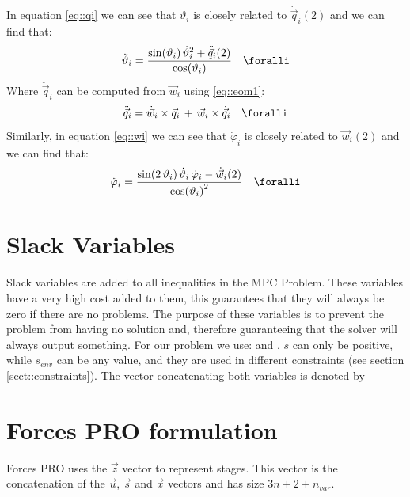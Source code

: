In equation \ref{eq::qi} we can see that $\dot\vartheta_i$ is closely related to $\dot{\vec q}_i(2)$ and we can find that:
\begin{equation}
	\ddot\vartheta_i=\frac{\sin(\vartheta_i)\,{\dot \vartheta_i}^2+\ddot{\vec q}_i(2)}{\cos(\vartheta_i)}
\quad\foralli
\end{equation}
Where $\ddot{\vec q}_i$ can be computed from $\dot{\vec w}_i$ using \ref{eq::eom1}:
\begin{equation}
	\ddot{\vec q}_i = \dot{\vec w}_i \times \vec q_i \, + \, \vec w_i \times \dot{\vec q}_i
\quad\foralli
\end{equation}
Similarly, in equation \ref{eq::wi} we can see that $\dot\varphi_i$ is closely related to $\vec w_i(2)$ and we can find that:
\begin{equation}
\ddot\varphi_i=\frac{\sin(2\,\vartheta_i)\,\dot \vartheta_i\,\dot \varphi_i-\dot{\vec w}_i(2)}{{\cos(\vartheta_i)}^2}
\quad\foralli
\end{equation}

\section{Slack Variables}
\label{sect::slack}
Slack variables are added to all inequalities in the MPC Problem. These variables have a very high cost added to them, this guarantees that they will always be zero if there are no problems. The purpose of these variables is to prevent the problem from having no solution and, therefore guaranteeing that the solver will always output something. For our problem we use:  and . $s$ can only be positive, while $s_{env}$ can be any value, and they are used in different constraints (see section \ref{sect::constraints}). The vector concatenating both variables is denoted by 

\section{Forces PRO formulation}
Forces PRO uses the $\vec z$ vector to represent stages. This vector is the concatenation of the $\vec{u}$, $\vec{s}$ and $\vec{x}$ vectors and has size $3n+2+n_{var}$.

